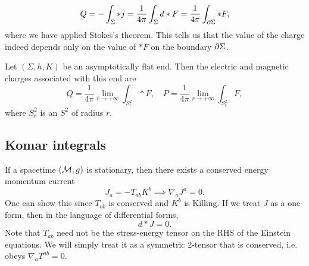 \begin{equation}
    Q = -\int_\Sigma * j = \frac{1}{4\pi} \int_\Sigma d* F =\frac{1}{4\pi} \int_{\partial \Sigma} *F,
\end{equation}
where we have applied Stokes's theorem. This tells us that the value of the charge indeed depends only on the value of $*F$ on the boundary $\partial \Sigma$.
\begin{defn}
    Let $(\Sigma,h,K)$ be an asymptotically flat end. Then the electric and magnetic charges associated with this end are
    \begin{equation}
        Q=\frac{1}{4\pi} \lim_{r\to +\infty} \int_{S^2_r} *F,\quad P= \frac{1}{4\pi} \lim_{r\to + \infty}\int_{S^2_r} F,
    \end{equation}
    where $S_r^2$ is an $S^2$ of radius $r$.
\end{defn}

\subsection*{Komar integrals}
If a spacetime $(\mathcal{M},g)$ is stationary, then there exists a conserved energy momentum current
\begin{equation}
    J_a = -T_{ab} K^b \implies \nabla_a J^a = 0.
\end{equation}
One can show this since $T_{ab}$ is conserved and $K^b$ is Killing. If we treat $J$ as a one-form, then in the language of differential forms,
\begin{equation}
    d*J=0.
\end{equation}
Note that $T_{ab}$ need not be the stress-energy tensor on the RHS of the Einstein equations. We will simply treat it as a symmetric 2-tensor that is conserved, i.e. obeys $\nabla_a T^{ab}=0$.

